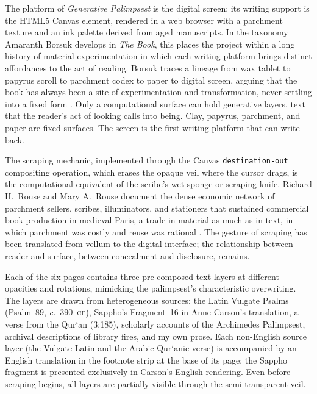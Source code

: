 \documentclass[12pt]{article}
\begin{document}
The platform of \textit{Generative Palimpsest} is the digital screen; its
writing support is the HTML5 Canvas element, rendered in a web browser with a
parchment texture and an ink palette derived from aged manuscripts. In the
taxonomy Amaranth Borsuk develops in \textit{The Book}, this places the project
within a long history of material experimentation in which each writing platform
brings distinct affordances to the act of reading. Borsuk traces a lineage from
wax tablet to papyrus scroll to parchment codex to paper to digital screen,
arguing that the book has always been a site of experimentation and
transformation, never settling into a fixed form \parencite{borsuk2018}. Only a
computational surface can hold generative layers, text that the reader's act
of looking calls into being. Clay, papyrus, parchment, and paper are fixed
surfaces. The screen is the first writing platform that can write back.

The scraping mechanic, implemented through the Canvas \texttt{destination-out}
compositing operation, which erases the opaque veil where the cursor drags, is
the computational equivalent of the scribe's wet sponge or scraping knife.
Richard H.~Rouse and Mary A.~Rouse document the dense economic network of
parchment sellers, scribes, illuminators, and stationers that sustained
commercial book production in medieval Paris, a trade in material as much as
in text, in which parchment was costly and reuse was rational \parencite{rouse2000}.
The gesture of
scraping has been translated from vellum to the digital interface; the
relationship between reader and surface, between concealment and disclosure,
remains.

Each of the six pages contains three pre-composed text layers at different
opacities and rotations, mimicking the palimpsest's characteristic overwriting.
The layers are drawn from heterogeneous sources: the Latin Vulgate Psalms
(Psalm~89, \textit{c.}~390~\textsc{ce}), Sappho's Fragment~16 in Anne Carson's
translation, a verse from the Qur\textquoteleft an (3:185), scholarly accounts
of the Archimedes Palimpsest, archival descriptions of library fires, and my own prose. Each non-English source layer (the Vulgate Latin and the
Arabic Qur\textquoteleft anic verse) is accompanied by an English translation
in the footnote strip at the base of its page; the Sappho fragment is presented
exclusively in Carson's English rendering. Even before scraping begins, all layers are partially visible through the semi-transparent veil.
\end{document}
